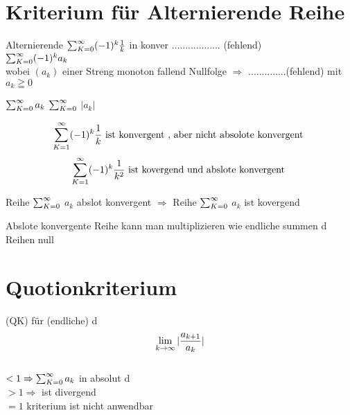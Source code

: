 \section{Kriterium für Alternierende  Reihe}
\begin{example}{Alternierende }
	$\sum_{K=0}^{\infty} (-1)^k \frac{1}{k}$ in konver .................. (fehlend)\\
	$\sum_{K=0}^{\infty} (-1)^k a_k$\\
	wobei $(a_k)$ einer Streng monoton fallend Nullfolge $\Rightarrow$ ..............(fehlend)
	mit $ a_k \geqq 0$
\end{example}
\begin{definition}[Reihe]
	
	 $\sum_{K=0}^{\infty}  a_k$   $\sum_{K=0}^{\infty} $ $|a_k|$ 
\end{definition}
\begin{example}

\[	\sum_{K=1}^{\infty} (-1)^k \frac{1}{k} \text{ ist konvergent , aber nicht absolote konvergent } \]
\[ \sum_{K=1}^{\infty} (-1)^k \frac{1}{k^2}  \text{ ist kovergend und abslote konvergent } \]
	
\end{example}
\begin{theorem}
Reihe $\sum_{K=0}^{\infty}$ $a_k$ abslot konvergent $\Rightarrow$ Reihe $\sum_{K=0}^{\infty}$ $a_k$ ist kovergend	
\end{theorem}
\begin{remark}
	
Abslote konvergente Reihe kann man multiplizieren wie endliche summen d Reihen null
\end{remark}
\section{Quotionkriterium}
(QK) für (endliche) d\\
\[\lim\limits_{k \rightarrow \infty} |\frac{a_{k+1}}{a_k}|\] \\$< 1 \Rightarrow \sum_{K=0}^{\infty} a_k $ in absolut d\\
$>1 \Rightarrow $ ist divergend\\
$=1 $ kriterium ist nicht anwendbar 
